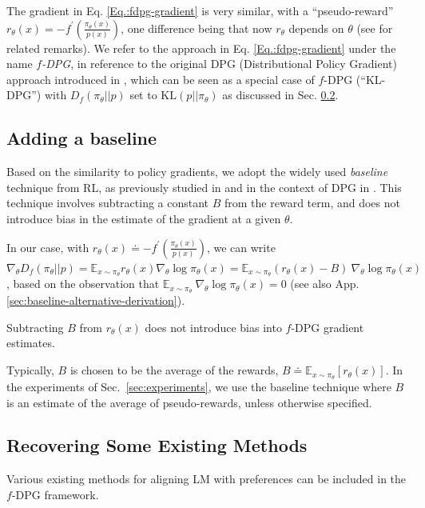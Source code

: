 The gradient in Eq. \ref{Eq.:fdpg-gradient} is very similar, with a ``pseudo-reward'' $r_\theta(x) = -f^{'}(\frac{\pi_{\theta}(x)}{p(x)})$, one difference being that now $r_\theta$ depends on $\theta$ (see \cite{korbak2022reinforcement} for related remarks). We refer to the approach in Eq. \ref{Eq.:fdpg-gradient} under the name \emph{$f$-DPG}, {in} reference to the original DPG (Distributional Policy Gradient) approach introduced in \cite{parshakova2019distributional}, which can be seen as a {special case} of $f$-DPG (``KL-DPG'')  {with} $D_f({\pi_\theta}||p)$ {set} to $\text{KL}(p||{\pi_\theta})$ {as discussed in Sec. \ref{sec:recovering_other_methods}}.

\subsection{{Adding} a baseline}\label{sec:baseline}

Based on the similarity {to policy gradients,} we adopt the widely used \emph{baseline} technique from RL, as previously studied in \citet{williams1992simple, baxter2001infinite, schulman2015high} and in the context of DPG in \cite{korbak2022reinforcement}. This technique involves subtracting a constant $B$ from the reward term, and does not introduce bias in the estimate of the gradient at a given $\theta$. 

In our {case}, with $r_\theta(x) \doteq -f^{'}(\frac{\pi_{\theta}(x)}{p(x)})$, we can write 
${\nabla_{\theta}} D_{f}({\pi_\theta}||p) = \mathbb{E}_{x\sim{\pi_\theta}} r_\theta(x) {\nabla_{\theta}}\log{\pi_\theta}(x) = \mathbb{E}_{x\sim{\pi_\theta}} (r_\theta(x) - B)\ {\nabla_{\theta}}\log{\pi_\theta}(x)${, based on the observation that $\mathbb{E}_{x\sim{\pi_\theta}} \ {\nabla_{\theta}}\log{\pi_\theta}(x) =0$ (see also App. \ref{sec:baseline-alternative-derivation}).}

\begin{fact}\label{fact:baseline}
Subtracting $B$ from $r_{\theta}(x)$ does not introduce bias into $f$-DPG gradient estimates.
\end{fact}

Typically, $B$ is chosen to be the average of the rewards, $B \doteq \mathbb{E}_{x\sim\pi_\theta}\left[r_\theta(x)\right]$.
In the experiments of Sec.~\ref{sec:experiments}, we use the baseline technique where $B$ is an estimate of the average of pseudo-rewards, unless otherwise specified.

\subsection{Recovering Some Existing Methods}\label{sec:recovering_other_methods}
Various existing methods for aligning LM with preferences can be included in the $f$-DPG framework.

